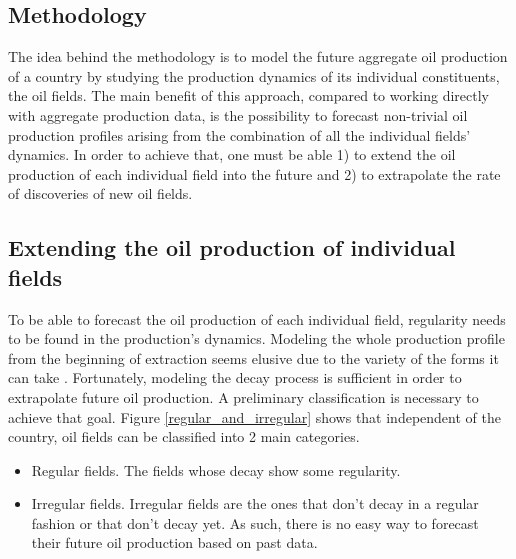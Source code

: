 \documentclass[twoside]{article}
\begin{document}
\begin{multicols}{2}

\section{Methodology}

The idea behind the methodology is to model the future aggregate oil production of a country by studying the production dynamics of its individual constituents, the oil fields. The main benefit of this approach, compared to working directly with aggregate production data, is the possibility to forecast non-trivial oil production profiles arising from the combination of all the individual fields' dynamics. In order to achieve that, one must be able 1) to extend the oil production of each individual field into the future and 2) to extrapolate the rate of discoveries of new oil fields.

\subsection{Extending the oil production of individual fields}
To be able to forecast the oil production of each individual field, regularity needs to be found in the production's dynamics. Modeling the whole production profile from the beginning of extraction seems elusive due to the variety of the forms it can take . Fortunately, modeling the decay process is sufficient in order to extrapolate future oil production. A preliminary classification is necessary to achieve that goal. Figure \ref{regular_and_irregular} shows that independent of the country, oil fields can be classified into 2 main categories. %

\begin{itemize}
\item Regular fields. The fields whose decay show some regularity. 
\item Irregular fields. Irregular fields are the ones that don't decay in a regular fashion or that don't decay yet. As such, there is no easy way to forecast their future oil production based on past data.
\end{itemize}


\end{multicols}
\end{document}
